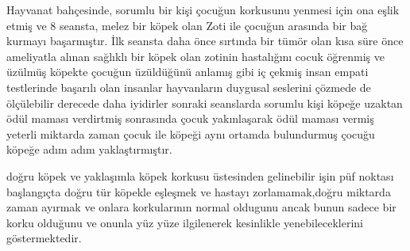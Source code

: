 \documentclass[12pt,a4paper]{article}
\begin{document}
\begin{enumerate}
			Hayvanat bahçesinde, sorumlu bir kişi çocuğun korkusunu yenmesi için ona eşlik etmiş ve 8 seansta, melez bir köpek olan Zoti ile çocuğun arasında bir bağ kurmayı başarmıştır.
			İlk seansta daha önce sırtında bir tümör olan kısa süre önce ameliyatla alınan sağlıklı bir  köpek olan zotinin hastalığını cocuk öğrenmiş ve üzülmüş köpekte çocuğun üzüldüğünü anlamış gibi iç çekmiş insan empati testlerinde başarılı olan insanlar hayvanların duygusal seslerini çözmede de ölçülebilir derecede daha iyidirler sonraki seanslarda sorumlu kişi  köpeğe uzaktan ödül maması verdirtmiş sonrasında çocuk yakınlaşarak ödül maması vermiş yeterli miktarda zaman çocuk ile köpeği aynı ortamda bulundurmuş çocuğu köpeğe adım adım yaklaştırmıştır.
			
			
			doğru köpek ve yaklaşımla köpek korkusu üstesinden gelinebilir işin püf noktası başlangıçta doğru tür köpekle eşleşmek ve hastayı zorlamamak,doğru miktarda zaman ayırmak ve onlara korkularının normal oldugunu ancak bunun sadece bir korku olduğunu ve onunla yüz yüze ilgilenerek kesinlikle yenebileceklerini göstermektedir\cite{ahsan2023deep}. \newline \newline

	\end{enumerate}
\end{document}
